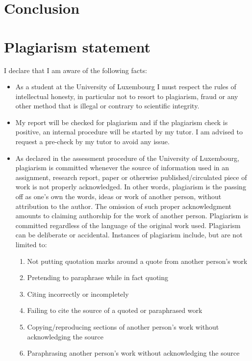\documentclass[conference,compsoc]{IEEEtran}
\begin{document}
\section{Conclusion}


\newpage


\section{Plagiarism statement}

I declare that I am aware of the following facts:
\begin{itemize}
  \item As a student at the University of Luxembourg I must respect the rules of intellectual honesty, in particular not to resort to plagiarism, fraud or any other method that is illegal or contrary to scientific integrity.
  \item My report will be checked for plagiarism and if the plagiarism check is positive, an internal procedure will be started by my tutor. I am advised to request a pre-check by my tutor to avoid any issue.
  \item As declared in the assessment procedure of the University of Luxembourg, plagiarism is committed whenever the source of information used in an assignment, research report, paper or otherwise published/circulated piece of work is not properly acknowledged. In other words, plagiarism is the passing off as one's own the words, ideas or work of another person, without attribution to the author. The omission of such proper acknowledgment amounts to claiming authorship for the work of another person. Plagiarism is committed regardless of the language of the original work used. Plagiarism can be deliberate or accidental.
        Instances of plagiarism include, but are not limited to:
        \begin{enumerate}
          \item Not putting quotation marks around a quote from another person's work
          \item Pretending to paraphrase while in fact quoting
          \item Citing incorrectly or incompletely
          \item Failing to cite the source of a quoted or paraphrased work
          \item Copying/reproducing sections of another person's work without acknowledging the source
          \item Paraphrasing another person's work without acknowledging the source

\end{enumerate}
\end{itemize}
\end{document}
